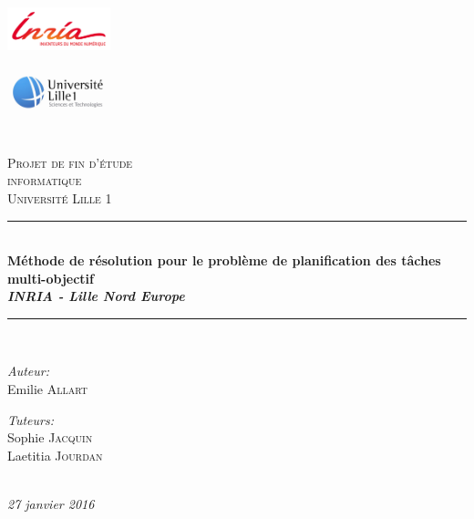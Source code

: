 \documentclass[a4paper,10pt]{report}
\date{2015-2016}
\newcommand{\HRule}{\rule{\linewidth}{0.5mm}}
\begin{document}
\begin{titlepage}
 \begin{center}

 \begin{minipage}{0.4\textwidth}
    \begin{flushleft} \large
        \includegraphics[width=3cm]{INRIA.jpg}
    \end{flushleft}
  \end{minipage}
  \begin{minipage}{0.4\textwidth}
    \begin{flushright} \large
      \includegraphics[width=3cm]{lille1.jpg}
    \end{flushright}
  \end{minipage} 
  ~\\[3cm]

  \textsc{\LARGE Projet de fin d'étude\\ informatique}\\[1.5cm]

  \textsc{\Large Université Lille 1}\\[0.5cm]

  \HRule \\[0.5 cm]
  { \huge \bfseries Méthode de résolution pour le problème de planification des tâches multi-objectif \\[0.8cm] \large \emph{INRIA - Lille Nord Europe} \\[0.4cm] }
  \HRule \\[1.5 cm]

  \begin{minipage}{0.4\textwidth}
    \begin{flushleft} \large
      \emph{Auteur:}\\
	Emilie \textsc{Allart}
    \end{flushleft}
  \end{minipage}
  \begin{minipage}{0.4\textwidth}
    \begin{flushright} \large
      \emph{Tuteurs:} \\
      Sophie \textsc{Jacquin} \\
      Laetitia \textsc{Jourdan} \\
    \end{flushright}
  \end{minipage} 

  \\[3cm]
  {\large \emph{27 janvier 2016} }
  \vfill
 \end{center}
\end{titlepage}
\end{document}
